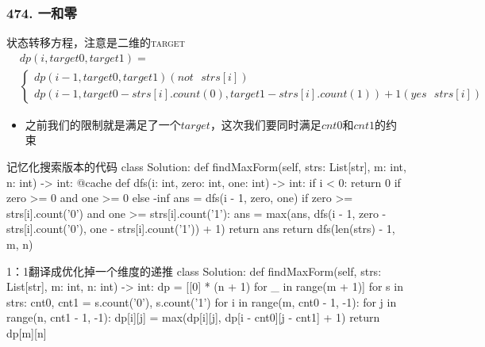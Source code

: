 \begin{frame}[fragile]          %
  \frametitle{\textsc{474. 一和零}}
  \begin{alertblock}{状态转移方程，注意是二维的\textsc{target}}
    \begin{align}
      & dp(i,target 0,target 1)=\\ & \begin{cases}
      dp(i-1,target 0, target 1)(not \text{ }strs[i]) \\
      dp(i-1,target 0-strs[i].count(0),target 1-strs[i].count(1))+1(yes \text{ }strs[i])
      \end{cases}
      \end{align}
  \end{alertblock}
  \begin{itemize}
    \item 之前我们的限制就是满足了一个$target$，这次我们要同时满足$cnt0$和$cnt1$的约束
  \end{itemize}
\end{frame}


\begin{frame}[fragile]
  \begin{codeblock}[language=python]{记忆化搜索版本的代码}
class Solution:
    def findMaxForm(self, strs: List[str], m: int, n: int) -> int:
        @cache
        def dfs(i: int, zero: int, one: int) -> int:
            if i < 0:
                return 0 if zero >= 0 and one >= 0 else -inf
            ans = dfs(i - 1, zero, one)
            if zero >= strs[i].count('0') and one >= strs[i].count('1'):
                ans = max(ans, dfs(i - 1, zero - strs[i].count('0'), one - strs[i].count('1')) + 1)
            return ans
        return dfs(len(strs) - 1, m, n)
  \end{codeblock}
\end{frame}



\begin{frame}[fragile]          %
  
  \begin{codeblock}[language=python]{1：1翻译成优化掉一个维度的递推}
class Solution:
    def findMaxForm(self, strs: List[str], m: int, n: int) -> int:
        dp = [[0] * (n + 1) for _ in range(m + 1)]
        for s in strs:
            cnt0, cnt1 = s.count('0'), s.count('1')
            for i in range(m, cnt0 - 1, -1):
                for j in range(n, cnt1 - 1, -1):
                    dp[i][j] = max(dp[i][j], dp[i - cnt0][j - cnt1] + 1)
        return dp[m][n]
  \end{codeblock}
\end{frame}


